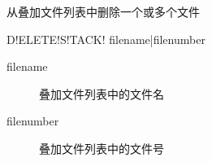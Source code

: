 \label{sss:deletestack}

从叠加文件列表中删除一个或多个文件

\begin{SACSTX}
D!ELETE!S!TACK! filename|filenumber
\end{SACSTX}

\begin{description}
\item [filename] 叠加文件列表中的文件名
\item [filenumber] 叠加文件列表中的文件号
\end{description}
